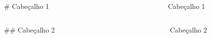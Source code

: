 \documentclass[
]{book}
\begin{document}
\begin{columns}

\begin{column}

\# Cabeçalho 1

\end{column}

\begin{column}

~

\end{column}

\begin{column}

\hypertarget{cabeuxe7alho-1}{}
\begin{section}

Cabeçalho 1

\end{section}

\end{column}

\end{columns}

\begin{columns}

\begin{column}

\#\# Cabeçalho 2

\end{column}

\begin{column}

~

\end{column}

\begin{column}

\hypertarget{cabeuxe7alho-2}{}
\begin{section}

Cabeçalho 2

\end{section}

\end{column}

\end{columns}
\end{document}
